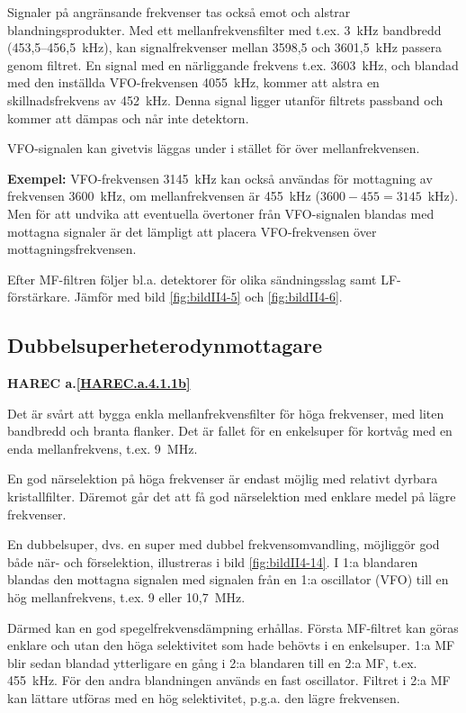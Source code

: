 Signaler på angränsande frekvenser tas också emot och alstrar
blandningsprodukter.
Med ett mellanfrekvensfilter med t.ex. 3~kHz bandbredd (453,5--456,5~kHz),
kan signalfrekvenser mellan 3598,5 och 3601,5~kHz passera genom filtret.
En signal med en närliggande frekvens t.ex. 3603~kHz, och blandad med den
inställda VFO-frekvensen 4055~kHz, kommer att alstra en skillnadsfrekvens av
452~kHz.
Denna signal ligger utanför filtrets passband och kommer att dämpas och når
inte detektorn.

VFO-signalen kan givetvis läggas under i stället för över mellanfrekvensen.

\textbf{Exempel:}
VFO-frekvensen 3145~kHz kan också användas för mottagning av frekvensen
3600~kHz, om mellanfrekvensen är 455~kHz (\(3600 - 455 = 3145\)~kHz).
Men för att undvika att eventuella övertoner från VFO-signalen blandas med
mottagna signaler är det lämpligt att placera VFO-frekvensen över
mottagningsfrekvensen.

Efter MF-filtren följer bl.a. detektorer för olika sändningsslag samt
LF-förstärkare.
Jämför med bild \ref{fig:bildII4-5} och \ref{fig:bildII4-6}.

\subsection{Dubbelsuperheterodynmottagare}
\textbf{HAREC a.\ref{HAREC.a.4.1.1b}\label{myHAREC.a.4.1.1b}}

Det är svårt att bygga enkla mellanfrekvensfilter för höga frekvenser,
med liten bandbredd och branta flanker. Det är fallet för en
enkelsuper för kortvåg med en enda mellanfrekvens, t.ex. 9~MHz.

En god närselektion på höga frekvenser är endast möjlig med relativt
dyrbara kristallfilter.
Däremot går det att få god närselektion med enklare medel på lägre frekvenser.

En dubbelsuper, dvs. en super med dubbel frekvensomvandling,
möjliggör god både när- och förselektion, illustreras i bild
\ref{fig:bildII4-14}.
I 1:a blandaren blandas den mottagna signalen med signalen från en
1:a oscillator (VFO) till en hög mellanfrekvens, t.ex. 9 eller 10,7~MHz.

Därmed kan en god spegelfrekvensdämpning erhållas.
Första MF-filtret kan göras enklare och utan den höga selektivitet som hade
behövts i en enkelsuper.
1:a MF blir sedan blandad ytterligare en gång i 2:a blandaren till en 2:a MF,
t.ex. 455~kHz.
För den andra blandningen används en fast oscillator.
Filtret i 2:a MF kan lättare utföras med en hög selektivitet, p.g.a. den
lägre frekvensen.

